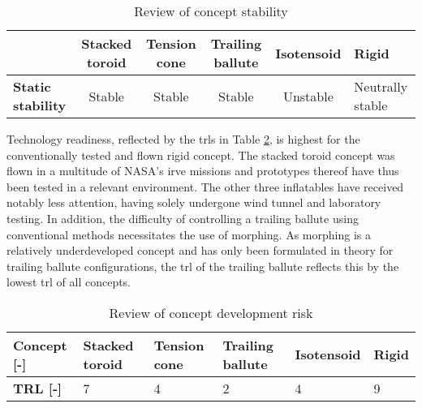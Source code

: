 \begin{table}[ht]
\caption{Review of concept stability}
\hspace{-10mm}
\begin{tabular}{|p{2.5cm}|c|c|c|c|p{2cm}|}
\hline
\textbf{}                          & \textbf{Stacked toroid} & \textbf{Tension cone} & \textbf{Trailing ballute} & \textbf{Isotensoid} & \textbf{Rigid} \\ \hline
\textbf{Static stability} &\cellcolor{green!70} Stable  &\cellcolor{green!70}  Stable   &\cellcolor{green!70} Stable & \cellcolor{red!60}   Unstable          &\cellcolor{yellow!75} Neutrally stable                 \\ \hline
\end{tabular}
\label{tab:stab}
\end{table}
Technology readiness, reflected by the \glspl{trl} in Table \ref{tab:gls_rev}, is highest for the conventionally tested and flown rigid concept. The stacked toroid concept was flown in a multitude of NASA's \gls{irve} missions and prototypes thereof have thus been tested in a relevant environment. The other three inflatables have received notably less attention, having solely undergone wind tunnel and laboratory testing. In addition, the difficulty of controlling a trailing ballute using conventional methods necessitates the use of morphing. As morphing is a relatively underdeveloped concept and has only been formulated in theory for trailing ballute configurations, the \gls{trl} of the trailing ballute reflects this by the lowest \gls{trl} of all concepts.
\begin{table}[ht]
\centering
\caption{Review of concept development risk}
\begin{tabular}{|l|l|l|l|l|l|}
\hline
\textbf{Concept {[}-{]}} & \textbf{Stacked toroid} & \textbf{Tension cone} & \textbf{Trailing ballute} & \textbf{Isotensoid} & \textbf{Rigid} \\ \hline \hline
\textbf{TRL {[}-{]}}     &\cellcolor{green!70} 7  &\cellcolor{yellow!75}  4   &\cellcolor{red!60} 2 & \cellcolor{yellow!75}      4          &\cellcolor{green!70} 9     \\ \hline
\end{tabular}
\label{tab:gls_rev}
\end{table}






